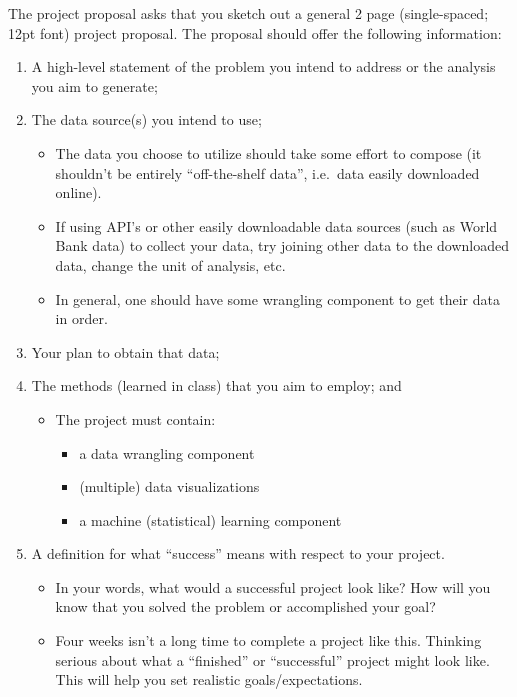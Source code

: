 \documentclass[
  12pt,
]{article}
\providecommand{\tightlist}{%
  \setlength{\itemsep}{0pt}\setlength{\parskip}{0pt}}
\begin{document}
The project proposal asks that you sketch out a general 2 page
(single-spaced; 12pt font) project proposal. The proposal should offer
the following information:

\begin{enumerate}
\def\labelenumi{\arabic{enumi}.}
\tightlist
\item
  A high-level statement of the problem you intend to address or the
  analysis you aim to generate;
\item
  The data source(s) you intend to use;

  \begin{itemize}
  \tightlist
  \item
    The data you choose to utilize should take some effort to compose
    (it shouldn't be entirely ``off-the-shelf data'', i.e.~data easily
    downloaded online).
  \item
    If using API's or other easily downloadable data sources (such as
    World Bank data) to collect your data, try joining other data to the
    downloaded data, change the unit of analysis, etc.
  \item
    In general, one should have some wrangling component to get their
    data in order.
  \end{itemize}
\item
  Your plan to obtain that data;
\item
  The methods (learned in class) that you aim to employ; and

  \begin{itemize}
  \tightlist
  \item
    The project must contain:

    \begin{itemize}
    \tightlist
    \item
      a data wrangling component
    \item
      (multiple) data visualizations
    \item
      a machine (statistical) learning component
    \end{itemize}
  \end{itemize}
\item
  A definition for what ``success'' means with respect to your project.

  \begin{itemize}
  \tightlist
  \item
    In your words, what would a successful project look like? How will
    you know that you solved the problem or accomplished your goal?
  \item
    Four weeks isn't a long time to complete a project like this.
    Thinking serious about what a ``finished'' or ``successful'' project
    might look like. This will help you set realistic
    goals/expectations.
  \end{itemize}
\end{enumerate}
\end{document}
